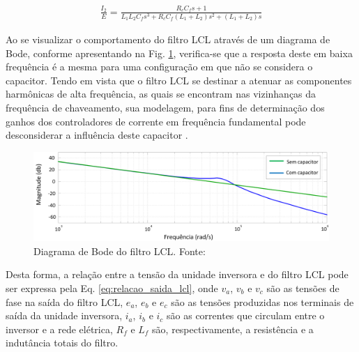 \begin{align}\label{eq:funcao_tranf_lcl}
	\frac{I_2}{E} = \frac{R_cC_fs + 1}{L_1L_2C_fs^3 + R_cC_f(L_1 + L_2)s^2 + (L_1 + L_2)s}
\end{align}

Ao se visualizar o comportamento do filtro LCL através de um diagrama de Bode, conforme apresentando na Fig. \ref{fig:Diagrama_Bode_LCL}, verifica-se que a resposta deste em baixa frequência é a mesma para uma configuração em que não se considera o capacitor. Tendo em vista que o filtro LCL se destinar a atenuar as componentes harmônicas de alta frequência, as quais se encontram nas vizinhanças da frequência de chaveamento, sua modelagem, para fins de determinação dos ganhos dos controladores de corrente em frequência fundamental pode desconsiderar a influência deste capacitor \cite{TeseProfAlex}.

\begin{figure}[!hbt]
	\begin{center}
		\includegraphics[width=\columnwidth]{figuras/Diagrama_Bode_Filtro_LCL.png}
		\caption{Diagrama de Bode do filtro LCL. Fonte: \cite{TeseProfAlex}}
		\label{fig:Diagrama_Bode_LCL}
	\end{center}
\end{figure}

Desta forma, a relação entre a tensão da unidade inversora e do filtro LCL pode ser expressa pela Eq. \ref{eq:relacao_saida_lcl}, onde $v_a$, $v_b$ e $v_c$ são as tensões de fase na saída do filtro LCL, $e_a$, $e_b$ e $e_c$ são as tensões produzidas nos terminais de saída da unidade inversora, $i_a$, $i_b$ e $i_c$ são as correntes que circulam entre o inversor e a rede elétrica, $R_f$ e $L_f$ são, respectivamente, a resistência e a indutância totais do filtro.

